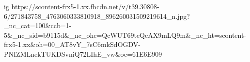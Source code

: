  
 
 
 
 

\ifcmt
  ig https://scontent-frx5-1.xx.fbcdn.net/v/t39.30808-6/271843758_4763060333810918_896260031509219614_n.jpg?_nc_cat=100&ccb=1-5&_nc_sid=b9115d&_nc_ohc=QcWUT69teQcAX9mLQ9m&_nc_ht=scontent-frx5-1.xx&oh=00_AT8vY_7sC6mkSdOGDV-PNIZMLnekTUKDSvniQ72LIhE_vw&oe=61E6E909
\fi
